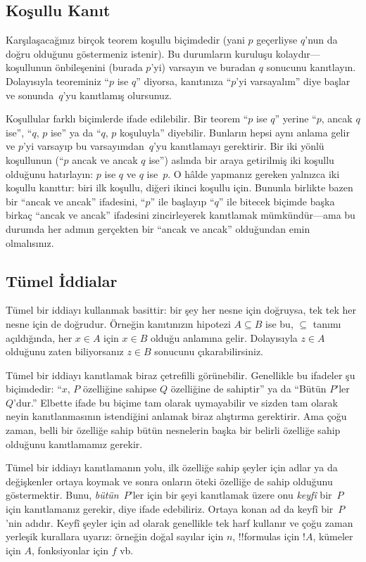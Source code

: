 \subsection{Koşullu Kanıt}

Karşılaşacağınız birçok teorem koşullu biçimdedir (yani $p$ geçerliyse
$q$'nun da doğru olduğunu göstermeniz istenir). Bu durumların kuruluşu
kolaydır---koşullunun önbileşenini (burada $p$'yi) varsayın ve buradan
$q$ sonucunu kanıtlayın. Dolayısıyla teoreminiz ``$p$ ise $q$'' diyorsa,
kanıtınıza ``$p$'yi varsayalım'' diye başlar ve sonunda~$q$'yu
kanıtlamış olursunuz.

Koşullular farklı biçimlerde ifade edilebilir. Bir teorem ``$p$ ise
$q$'' yerine ``$p$, ancak $q$ ise'', ``$q$, $p$ ise'' ya da ``$q$,
$p$ koşuluyla'' diyebilir. Bunların hepsi aynı anlama gelir ve $p$'yi
varsayıp bu varsayımdan~$q$'yu kanıtlamayı gerektirir. Bir iki yönlü
koşullunun (``$p$ ancak ve ancak $q$ ise'') aslında bir araya getirilmiş
iki koşullu olduğunu hatırlayın: $p$ ise $q$ ve $q$ ise~$p$. O hâlde
yapmanız gereken yalnızca iki koşullu kanıttır: biri ilk koşullu, diğeri
ikinci koşullu için. Bununla birlikte bazen bir ``ancak ve ancak''
ifadesini, ``$p$'' ile başlayıp ``$q$'' ile bitecek biçimde başka birkaç
``ancak ve ancak'' ifadesini zincirleyerek kanıtlamak mümkündür---ama bu
durumda her adımın gerçekten bir ``ancak ve ancak'' olduğundan emin
olmalısınız.

\subsection{Tümel İddialar}

Tümel bir iddiayı kullanmak basittir: bir şey her nesne için doğruysa,
tek tek her nesne için de doğrudur. Örneğin kanıtınızın hipotezi $A
\subseteq B$ ise bu, $\subseteq$ tanımı açıldığında, her $x \in A$ için
$x \in B$ olduğu anlamına gelir. Dolayısıyla $z \in A$ olduğunu zaten
biliyorsanız $z \in B$ sonucunu çıkarabilirsiniz.

Tümel bir iddiayı kanıtlamak biraz çetrefilli görünebilir. Genellikle
bu ifadeler şu biçimdedir: ``$x$, $P$ özelliğine sahipse $Q$ özelliğine
de sahiptir'' ya da ``Bütün $P$'ler $Q$'dur.'' Elbette ifade bu biçime
tam olarak uymayabilir ve sizden tam olarak neyin kanıtlanmasının
istendiğini anlamak biraz alıştırma gerektirir. Ama çoğu zaman, belli
bir özelliğe sahip bütün nesnelerin başka bir belirli özelliğe sahip
olduğunu kanıtlamamız gerekir.

Tümel bir iddiayı kanıtlamanın yolu, ilk özelliğe sahip şeyler için
adlar ya da değişkenler ortaya koymak ve sonra onların öteki özelliğe
de sahip olduğunu göstermektir. Bunu, \emph{bütün}~$P$'ler için bir şeyi
kanıtlamak üzere onu \emph{keyfî} bir~$P$ için kanıtlamanız gerekir,
diye ifade edebiliriz. Ortaya konan ad da keyfî bir~$P$'nin adıdır.
Keyfî şeyler için ad olarak genellikle tek harf kullanır ve çoğu zaman
yerleşik kurallara uyarız: örneğin doğal sayılar için $n$,
!!{formula}s için $!A$, kümeler için $A$, fonksiyonlar için $f$ vb.


